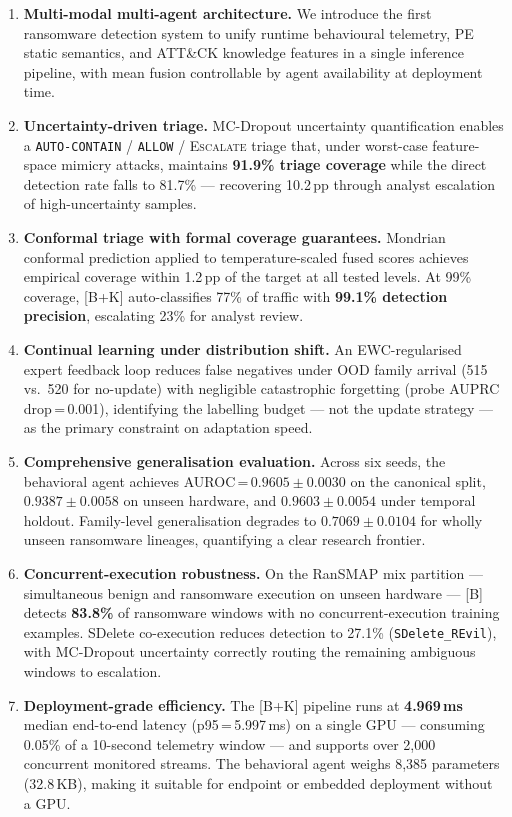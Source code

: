 \documentclass[journal]{IEEEtran}
\begin{document}
\begin{enumerate}

\item \textbf{Multi-modal multi-agent architecture.}
We introduce the first ransomware detection system to unify runtime
behavioural telemetry, PE static semantics, and ATT\&CK knowledge features in
a single inference pipeline, with mean fusion controllable by agent
availability at deployment time.

\item \textbf{Uncertainty-driven triage.}
MC-Dropout uncertainty quantification enables a \texttt{AUTO-CONTAIN} /
\texttt{ALLOW} / \textsc{Escalate} triage that, under worst-case
feature-space mimicry attacks, maintains \textbf{91.9\% triage coverage}
while the direct detection rate falls to 81.7\% --- recovering 10.2\,pp
through analyst escalation of high-uncertainty samples.

\item \textbf{Conformal triage with formal coverage guarantees.}
Mondrian conformal prediction applied to temperature-scaled fused scores
achieves empirical coverage within 1.2\,pp of the target at all tested levels.
At 99\% coverage, [B+K] auto-classifies 77\% of traffic with
\textbf{99.1\% detection precision}, escalating 23\% for analyst review.

\item \textbf{Continual learning under distribution shift.}
An EWC-regularised expert feedback loop reduces false negatives under OOD
family arrival (515 vs.\ 520 for no-update) with negligible catastrophic
forgetting (probe AUPRC drop\,=\,0.001), identifying the labelling budget ---
not the update strategy --- as the primary constraint on adaptation speed.

\item \textbf{Comprehensive generalisation evaluation.}
Across six seeds, the behavioral agent achieves
AUROC\,=\,$0.9605 \pm 0.0030$ on the canonical split,
$0.9387 \pm 0.0058$ on unseen hardware, and $0.9603 \pm 0.0054$ under
temporal holdout.
Family-level generalisation degrades to $0.7069 \pm 0.0104$ for wholly unseen
ransomware lineages, quantifying a clear research frontier.

\item \textbf{Concurrent-execution robustness.}
On the RanSMAP mix partition --- simultaneous benign and ransomware execution
on unseen hardware --- [B] detects \textbf{83.8\%} of ransomware windows with
no concurrent-execution training examples.
SDelete co-execution reduces detection to 27.1\% (\texttt{SDelete\_REvil}),
with MC-Dropout uncertainty correctly routing the remaining ambiguous windows
to escalation.

\item \textbf{Deployment-grade efficiency.}
The [B+K] pipeline runs at \textbf{4.969\,ms} median end-to-end latency
(p95\,=\,5.997\,ms) on a single GPU --- consuming 0.05\% of a 10-second
telemetry window --- and supports over 2,000 concurrent monitored streams.
The behavioral agent weighs 8,385 parameters (32.8\,KB), making it suitable
for endpoint or embedded deployment without a GPU.

\end{enumerate}
\end{document}
